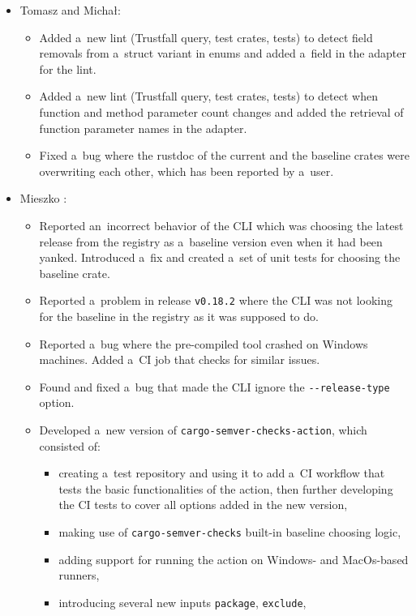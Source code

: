 \documentclass[licencjacka,en]{pracamgr}
\begin{document}
\begin{itemize}
	\item Tomasz and Michał:
		\begin{itemize}
			\item Added a~new lint (Trustfall query, test crates, tests) to detect field removals
				from a~struct variant in enums and added a~field in the adapter for the lint.
			\item Added a~new lint (Trustfall query, test crates, tests) to detect when function
				and method parameter count changes and added the retrieval of function parameter
				names in the adapter.
			\item Fixed a~bug where the rustdoc of the current and the baseline crates
				were overwriting each other, which has been reported by a~user.
		\end{itemize}

	\item Mieszko \cite{responsibilities-mieszko}:
		\begin{itemize}
			\item Reported an~incorrect behavior of the CLI which was choosing the latest release
				from the registry as a~baseline version even when it had been yanked.
				Introduced a~fix and created a~set of unit tests for choosing the baseline crate.
			\item Reported a~problem in release \texttt{v0.18.2} where the CLI was not looking for
				the baseline in the registry as it was supposed to do.
			\item Reported a~bug where the pre-compiled tool crashed on Windows machines.
				Added a~CI job that checks for similar issues.
			\item Found and fixed a~bug that made the CLI ignore
				the \texttt{-{}-release-type} option.
			\item Developed a~new version of \texttt{cargo-semver-checks-action},
				which consisted of:
			\begin{itemize}
				\item creating a~test repository \cite{responsibilities-mieszko-action-tests}
					and using it to add a~CI workflow that tests the basic functionalities of
					the action, then further developing the CI tests to cover all options added in
					the new version,
				\item making use of \texttt{cargo-semver-checks} built-in baseline choosing logic,
				\item adding support for running the action on Windows- and MacOs-based runners,
				\item introducing several new inputs \texttt{package}, \texttt{exclude},

\end{itemize}
\end{itemize}
\end{itemize}
\end{document}
